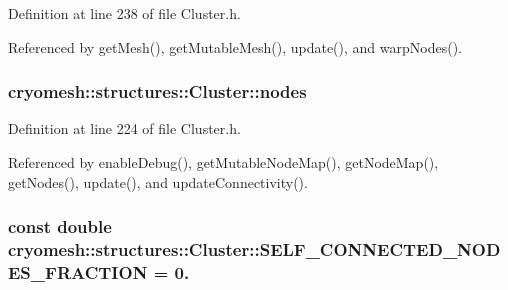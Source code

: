 \-Definition at line 238 of file \-Cluster.\-h.



\-Referenced by get\-Mesh(), get\-Mutable\-Mesh(), update(), and warp\-Nodes().

\hypertarget{classcryomesh_1_1structures_1_1Cluster_aebd26b5e561d3616ff3564cea8f6abfd}{
\subsubsection[{nodes}]{ {\bf cryomesh\-::structures\-::\-Cluster\-::nodes}}}\label{classcryomesh_1_1structures_1_1Cluster_aebd26b5e561d3616ff3564cea8f6abfd}


\-Definition at line 224 of file \-Cluster.\-h.



\-Referenced by enable\-Debug(), get\-Mutable\-Node\-Map(), get\-Node\-Map(), get\-Nodes(), update(), and update\-Connectivity().

\hypertarget{classcryomesh_1_1structures_1_1Cluster_a42b6ded89948ab38383ce0b818c78b54}{
\subsubsection[{\-S\-E\-L\-F\-\_\-\-C\-O\-N\-N\-E\-C\-T\-E\-D\-\_\-\-N\-O\-D\-E\-S\-\_\-\-F\-R\-A\-C\-T\-I\-O\-N}]{\setlength{\rightskip}{0pt plus 5cm}const double {\bf cryomesh\-::structures\-::\-Cluster\-::\-S\-E\-L\-F\-\_\-\-C\-O\-N\-N\-E\-C\-T\-E\-D\-\_\-\-N\-O\-D\-E\-S\-\_\-\-F\-R\-A\-C\-T\-I\-O\-N} = 0.}}\label{classcryomesh_1_1structures_1_1Cluster_a42b6ded89948ab38383ce0b818c78b54}


